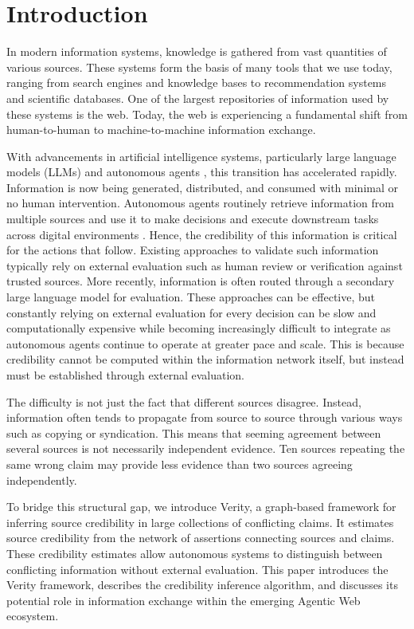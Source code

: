 \section{Introduction}

In modern information systems, knowledge is gathered from vast quantities of various sources. These systems form the basis of many tools that we use today, ranging from search engines and knowledge bases to recommendation systems and scientific databases. One of the largest repositories of information used by these systems is the web. Today, the web is experiencing a fundamental shift from human-to-human to machine-to-machine information exchange.

With advancements in artificial intelligence systems, particularly large language models (LLMs) \cite{openai2023gpt4} and autonomous agents \cite{xi2023rise}, this transition has accelerated rapidly. Information is now being generated, distributed, and consumed with minimal or no human intervention. Autonomous agents routinely retrieve information from multiple sources and use it to make decisions and execute downstream tasks across digital environments \cite{masterman2024landscape}. Hence, the credibility of this information is critical for the actions that follow. Existing approaches to validate such information typically rely on external evaluation such as human review or verification against trusted sources. More recently, information is often routed through a secondary large language model for evaluation. These approaches can be effective, but constantly relying on external evaluation for every decision can be slow and computationally expensive while becoming increasingly difficult to integrate as autonomous agents continue to operate at greater pace and scale. This is because credibility cannot be computed within the information network itself, but instead must be established through external evaluation.

The difficulty is not just the fact that different sources disagree. Instead, information often tends to propagate from source to source through various ways such as copying or syndication. This means that seeming agreement between several sources is not necessarily independent evidence. Ten sources repeating the same wrong claim may provide less evidence than two sources agreeing independently.

To bridge this structural gap, we introduce Verity, a graph-based framework for inferring source credibility in large collections of conflicting claims. It estimates source credibility from the network of assertions connecting sources and claims. These credibility estimates allow autonomous systems to distinguish between conflicting information without external evaluation. This paper introduces the Verity framework, describes the credibility inference algorithm, and discusses its potential role in information exchange within the emerging Agentic Web ecosystem.